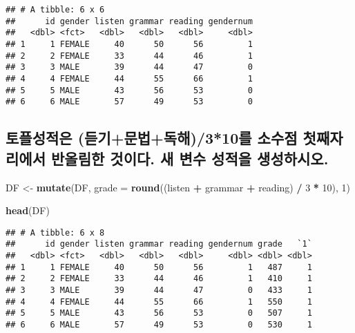 \documentclass[
]{article}
\newenvironment{Shaded}{\begin{snugshade}}{\end{snugshade}}
\newcommand{\DataTypeTok}[1]{\textcolor[rgb]{0.13,0.29,0.53}{#1}}
\newcommand{\DecValTok}[1]{\textcolor[rgb]{0.00,0.00,0.81}{#1}}
\newcommand{\KeywordTok}[1]{\textcolor[rgb]{0.13,0.29,0.53}{\textbf{#1}}}
\newcommand{\NormalTok}[1]{#1}
\newcommand{\OperatorTok}[1]{\textcolor[rgb]{0.81,0.36,0.00}{\textbf{#1}}}
\newcommand{\StringTok}[1]{\textcolor[rgb]{0.31,0.60,0.02}{#1}}
\begin{document}
\begin{verbatim}
## # A tibble: 6 x 6
##      id gender listen grammar reading gendernum
##   <dbl> <fct>   <dbl>   <dbl>   <dbl>     <dbl>
## 1     1 FEMALE     40      50      56         1
## 2     2 FEMALE     33      44      46         1
## 3     3 MALE       39      44      47         0
## 4     4 FEMALE     44      55      66         1
## 5     5 MALE       43      56      53         0
## 6     6 MALE       57      49      53         0
\end{verbatim}

\hypertarget{uxd1a0uxd50cuxc131uxc801uxc740-uxb4e3uxae30uxbb38uxbc95uxb3c5uxd574310uxb97c-uxc18cuxc218uxc810-uxccabuxc9f8uxc790uxb9acuxc5d0uxc11c-uxbc18uxc62cuxb9bcuxd55c-uxac83uxc774uxb2e4.-uxc0c8-uxbcc0uxc218-uxc131uxc801uxc744-uxc0dduxc131uxd558uxc2dcuxc624.}{%
\subsection{토플성적은 (듣기+문법+독해)/3*10를 소수점 첫째자리에서
반올림한 것이다. 새 변수 성적을
생성하시오.}\label{uxd1a0uxd50cuxc131uxc801uxc740-uxb4e3uxae30uxbb38uxbc95uxb3c5uxd574310uxb97c-uxc18cuxc218uxc810-uxccabuxc9f8uxc790uxb9acuxc5d0uxc11c-uxbc18uxc62cuxb9bcuxd55c-uxac83uxc774uxb2e4.-uxc0c8-uxbcc0uxc218-uxc131uxc801uxc744-uxc0dduxc131uxd558uxc2dcuxc624.}}

\begin{Shaded}
\begin{Highlighting}[]
\NormalTok{DF <-}\StringTok{ }\KeywordTok{mutate}\NormalTok{(DF, }\DataTypeTok{grade =} \KeywordTok{round}\NormalTok{((listen }\OperatorTok{+}\StringTok{ }\NormalTok{grammar }\OperatorTok{+}\StringTok{ }\NormalTok{reading) }\OperatorTok{/}\StringTok{ }\DecValTok{3} \OperatorTok{*}\StringTok{ }\DecValTok{10}\NormalTok{), }\DecValTok{1}\NormalTok{)}

\KeywordTok{head}\NormalTok{(DF)}
\end{Highlighting}
\end{Shaded}

\begin{verbatim}
## # A tibble: 6 x 8
##      id gender listen grammar reading gendernum grade   `1`
##   <dbl> <fct>   <dbl>   <dbl>   <dbl>     <dbl> <dbl> <dbl>
## 1     1 FEMALE     40      50      56         1   487     1
## 2     2 FEMALE     33      44      46         1   410     1
## 3     3 MALE       39      44      47         0   433     1
## 4     4 FEMALE     44      55      66         1   550     1
## 5     5 MALE       43      56      53         0   507     1
## 6     6 MALE       57      49      53         0   530     1
\end{verbatim}
\end{document}
